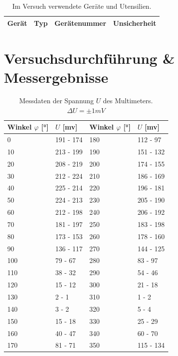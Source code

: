 \documentclass[12pt,a4paper,twoside]{article}
\begin{document}
    \begin{table}[H]
        \centering
        \caption{Im Versuch verwendete Geräte und Utensilien.}
        \label{tab:geraete}
        \begin{tabular}{| l | l | l | l |}
            \hline
            Gerät   & Typ   & Gerätenummer  & Unsicherheit \\
            \hline
        \end{tabular}
    \end{table}


\section{Versuchsdurchführung \& Messergebnisse} %

\begin{table}[H]
    \centering
    \caption{Messdaten der Spannung $U$ des Multimeters. $\Delta U = \pm 1mV$}
    \label{tab:Messdaten Mallus}
    \begin{tabular}{| l | l | l | l |}
        \hline
        Winkel $\varphi$ [°] & $U$ [mv] & Winkel $\varphi$ [°] & $U$ [mv] \\
        \hline
        0    & 191 - 174  & 180   & 112 - 97   \\
        10   & 213 - 199  & 190   & 151 - 132  \\
        20   & 208 - 219  & 200   & 174 - 155  \\
        30   & 212 - 224  & 210   & 186 - 169  \\
        40   & 225 - 214  & 220   & 196 - 181  \\
        50   & 224 - 213  & 230   & 205 - 190  \\
        60   & 212 - 198  & 240   & 206 - 192  \\
        70   & 181 - 197  & 250   & 183 - 198  \\
        80   & 173 - 153  & 260   & 178 - 160  \\
        90   & 136 - 117  & 270   & 144 - 125  \\
        100  & 79 - 67    & 280   & 83 - 97    \\
        110  & 38 - 32    & 290   & 54 - 46    \\
        120  & 15 - 12    & 300   & 21 - 18    \\
        130  & 2 - 1      & 310   & 1 - 2      \\
        140  & 3 - 2      & 320   & 5 - 4      \\
        150  & 15 - 18    & 330   & 25 - 29    \\
        160  & 40 - 47    & 340   & 60 - 70    \\
        170  & 81 - 71    & 350   & 115 - 134  \\
        \hline
    \end{tabular}
\end{table}
\end{document}
